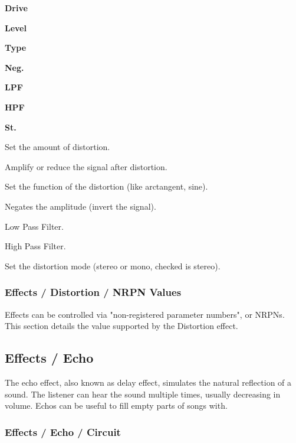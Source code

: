    \begin{enumber}
      \item \textbf{Drive}
      \item \textbf{Level}
      \item \textbf{Type}
      \item \textbf{Neg.}
      \item \textbf{LPF}
      \item \textbf{HPF}
      \item \textbf{St.}
   \end{enumber}

   \setcounter{ItemCounter}{0}      %

   Set the amount of distortion.

   Amplify or reduce the signal after distortion.

   Set the function of the distortion (like arctangent, sine).

   Negates the amplitude (invert the signal).

   Low Pass Filter.

   High Pass Filter.

   Set the distortion mode (stereo or mono, checked is stereo).

\subsubsection{Effects / Distortion / NRPN Values}
\label{subsubsec:effects_edit_distortion_nrpn}

   Effects can be controlled via "non-registered parameter numbers", or NRPNs.
   This section details the value supported by the Distortion effect.

\subsection{Effects / Echo}
\label{subsec:effects_edit_echo}

   The echo effect, also known as delay effect, simulates the natural
   reflection of a sound. The listener can hear the sound multiple times,
   usually decreasing in volume. Echos can be useful to fill empty parts of
   songs with.

\subsubsection{Effects / Echo / Circuit}
\label{subsubsec:effects_edit_echo_circuit}

